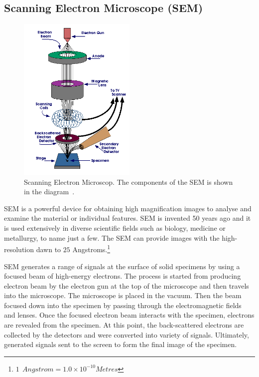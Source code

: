 \documentclass[12pt,a4paper,titlepage]{report}
\begin{document}
\subsection{Scanning Electron Microscope (\ac*{SEM})}\label{sem}



\begin{figure}
  \begin{center}
    \includegraphics[width=0.5\textwidth]{SEM}
  \caption[Scanning Electron Microscope]{Scanning Electron Microscop. The components of the \ac*{SEM} is shown 
in the diagram~\citep{Doe:2014Jan:Online}.}
  \label{SEM}
\end{center}
\end{figure}


\ac*{SEM} is a powerful device for obtaining high magnification images to analyse and examine
 the material or individual features. \ac*{SEM} is invented 50 years ago and it is used extensively 
in diverse scientific fields such as biology, medicine or metallurgy,  to name just a few. The \ac*{SEM} can 
provide images with the high-resolution dawn to $25$ Angstroms.\footnote{$1 ~\ Angstrom =
1.0 \times 10^{-10} Metres$}%



\ac*{SEM} generates a range of signals at the surface of solid specimens by using a focused beam
 of high-energy electrons. The process is started from producing electron beam by the electron gun 
at the top of the microscope and then travels into the microscope. The microscope is placed in the
 vacuum. Then the beam focused down into the specimen by passing through the electromagnetic
 fields and lenses. Once the focused electron beam interacts with the specimen, electrons are revealed 
from the specimen. At this point, the back-scattered electrons are collected by the detectors and were 
converted into variety of signals. Ultimately, generated signals sent to the screen to form the final image 
of the specimen\citep{Doe:2014Jan:Online}. 
\end{document}

